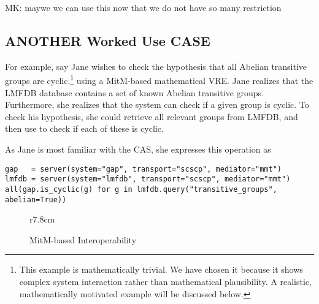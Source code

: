 \begin{oldpart}{MK: maywe we can use this now that we do not have so many restriction}
\subsection{ANOTHER Worked Use CASE}
  For example, say Jane wishes to check the hypothesis that all Abelian transitive groups
  are cyclic.\footnote{This example is mathematically trivial.  We have chosen it because
    it shows complex system interaction rather than mathematical plausibility.  A
    realistic, mathematically motivated example will be discussed below.}  using a
  MitM-based mathematical VRE.  Jane realizes that the LMFDB database contains a set of
  known Abelian transitive groups.  Furthermore, she realizes that the \GAP system can
  check if a given group is cyclic.  To check his hypothesis, she could retrieve all
  relevant groups from LMFDB, and then use \GAP to check if each of these is cyclic.

As Jane is most familiar with the \Sage CAS, she expresses this operation as
\begin{lstlisting}
gap   = server(system="gap", transport="scscp", mediator="mmt")
lmfdb = server(system="lmfdb", transport="scscp", mediator="mmt")
all(gap.is_cyclic(g) for g in lmfdb.query("transitive_groups", abelian=True))
\end{lstlisting}

\begin{wrapfigure}r{7.8cm}\vspace*{-2em}
  \caption{MitM-based Interoperability}\label{fig:mitmcomm}\vspace*{-1em}
\end{wrapfigure}


\end{oldpart}
